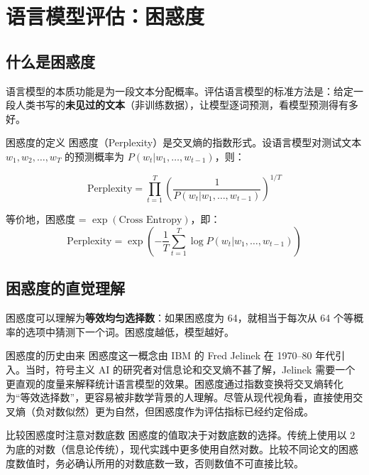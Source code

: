 \documentclass[a4paper]{article}
\begin{document}
\section{语言模型评估：困惑度}

\subsection{什么是困惑度}

语言模型的本质功能是为一段文本分配概率。评估语言模型的标准方法是：给定一段人类书写的\textbf{未见过的文本}（非训练数据），让模型逐词预测，看模型预测得有多好。

\begin{importantbox}{困惑度的定义}
困惑度（Perplexity）是交叉熵的指数形式。设语言模型对测试文本 $w_1, w_2, \ldots, w_T$ 的预测概率为 $P(w_t | w_1, \ldots, w_{t-1})$，则：

$$\text{Perplexity} = \prod_{t=1}^{T} \left( \frac{1}{P(w_t | w_1, \ldots, w_{t-1})} \right)^{1/T}$$

等价地，困惑度 = $\exp(\text{Cross Entropy})$，即：
$$\text{Perplexity} = \exp\left( -\frac{1}{T} \sum_{t=1}^{T} \log P(w_t | w_1, \ldots, w_{t-1}) \right)$$
\end{importantbox}





\subsection{困惑度的直觉理解}

困惑度可以理解为\textbf{等效均匀选择数}：如果困惑度为 64，就相当于每次从 64 个等概率的选项中猜测下一个词。困惑度越低，模型越好。

\begin{knowledgebox}{困惑度的历史由来}
困惑度这一概念由 IBM 的 Fred Jelinek 在 1970--80 年代引入。当时，符号主义 AI 的研究者对信息论和交叉熵不甚了解，Jelinek 需要一个更直观的度量来解释统计语言模型的效果。困惑度通过指数变换将交叉熵转化为``等效选择数''，更容易被非数学背景的人理解。尽管从现代视角看，直接使用交叉熵（负对数似然）更为自然，但困惑度作为评估指标已经约定俗成。
\end{knowledgebox}

\begin{warningbox}{比较困惑度时注意对数底数}
困惑度的值取决于对数底数的选择。传统上使用以 2 为底的对数（信息论传统），现代实践中更多使用自然对数。比较不同论文的困惑度数值时，务必确认所用的对数底数一致，否则数值不可直接比较。
\end{warningbox}
\end{document}
